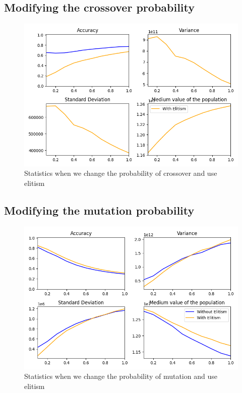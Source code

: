 \documentclass{article}
\begin{document}
    
    
    \subsection*{Modifying the crossover probability}

    \begin{figure}[H]

        \centering
        \includegraphics[width=1\textwidth]{../media/ej1/04.CrossoverProb_withElitism_behaviour.png}
        \caption{Statistics when we change the probability of crossover and use elitism}
        \label{Statistics when we change the probability of crossover and use elitism}

    \end{figure}

    
    \subsection*{Modifying the mutation probability}

    \begin{figure}[H]

        \centering
        \includegraphics[width=1\textwidth]{../media/ej1/05.MutationProb_withElitism_behaviour.png}
        \caption{Statistics when we change the probability of mutation and use elitism}
        \label{Statistics when we change the probability of mutation and use elitism}

    \end{figure}
\end{document}
